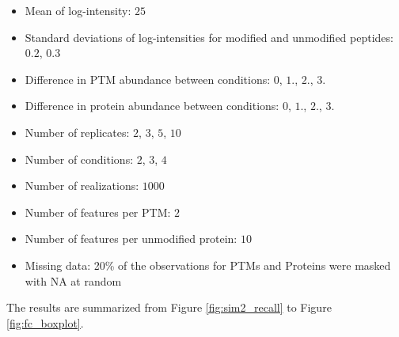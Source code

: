 \documentclass{mcp}
\begin{document}
\begin{itemize}
\item Mean of log-intensity: $25$
\item Standard deviations of log-intensities for modified and unmodified peptides: $0.2$, $0.3$
\item Difference in PTM abundance between conditions: $0$, $1.$, $2.$, $3.$
\item Difference in protein abundance between conditions: $0$, $1.$, $2.$, $3.$
\item Number of replicates: $2$, $3$, $5$, $10$
\item Number of conditions: $2$, $3$, $4$
\item Number of realizations: $1000$
\item Number of features per PTM: $2$
\item Number of features per unmodified protein: $10$
\item Missing data: 20\% of the observations for PTMs and Proteins were masked with NA at random
\end{itemize}

The results are summarized from Figure \ref{fig:sim2_recall} to Figure \ref{fig:fc_boxplot}.
\end{document}
